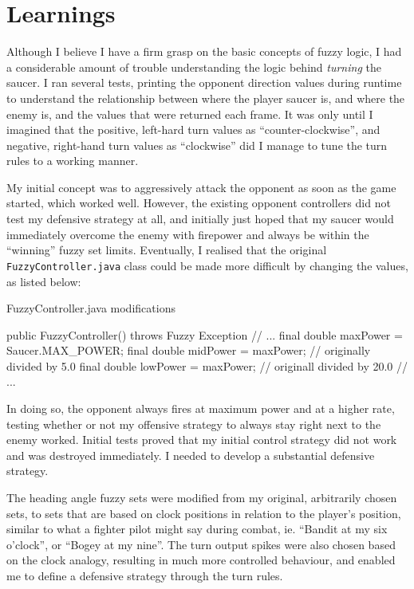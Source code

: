 \newpage

\section{Learnings}

Although I believe I have a firm grasp on the basic concepts of fuzzy logic, I had a considerable amount of trouble understanding the logic behind \emph{turning} the saucer. I ran several tests, printing the opponent direction values during runtime to understand the relationship between where the player saucer is, and where the enemy is, and the values that were returned each frame. It was only until I imagined that the positive, left-hard turn values as ``counter-clockwise'', and negative, right-hand turn values as ``clockwise'' did I manage to tune the turn rules to a working manner.

My initial concept was to aggressively attack the opponent as soon as the game started, which worked well. However, the existing opponent controllers did not test my defensive strategy at all, and initially just hoped that my saucer would immediately overcome the enemy with firepower and always be within the ``winning'' fuzzy set limits. Eventually, I realised that the original \texttt{FuzzyController.java} class could be made more difficult by changing the values, as listed below:

\begin{listing}[H]
\caption{FuzzyController.java modifications}

\begin{javacode}
public FuzzyController() throws Fuzzy Exception {
  // ...
  final double maxPower = Saucer.MAX_POWER;
  final double midPower = maxPower; // originally divided by 5.0
  final double lowPower = maxPower; // originall divided by 20.0
  // ...
}
\end{javacode}
\end{listing}

In doing so, the opponent always fires at maximum power and at a higher rate, testing whether or not my offensive strategy to always stay right next to the enemy worked. Initial tests proved that my initial control strategy did not work and was destroyed immediately. I needed to develop a substantial defensive strategy.

The heading angle fuzzy sets were modified from my original, arbitrarily chosen sets, to sets that are based on clock positions in relation to the player's position, similar to what a fighter pilot might say during combat, ie. ``Bandit at my six o'clock'', or ``Bogey at my nine''. The turn output spikes were also chosen based on the clock analogy, resulting in much more controlled behaviour, and enabled me to define a defensive strategy through the turn rules.

